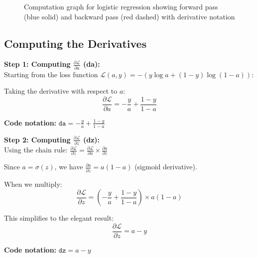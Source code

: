 \documentclass[11pt,a4paper]{article}
\theoremstyle{definition}
\theoremstyle{remark}
\begin{document}
\begin{figure}[H]
    \caption{Computation graph for logistic regression showing forward pass (blue solid) and backward pass (red dashed) with derivative notation}
    \label{fig:logistic_regression_graph}
\end{figure}

\clearpage
\subsection{Computing the Derivatives}

\begin{gradcomp}
\textbf{Step 1: Computing $\frac{\partial \mathcal{L}}{\partial a}$ (da):} \\
Starting from the loss function $\mathcal{L}(a, y) = -(y \log a + (1-y) \log(1-a))$:

Taking the derivative with respect to $a$:
\[
\frac{\partial \mathcal{L}}{\partial a} = -\frac{y}{a} + \frac{1-y}{1-a}
\]

\textbf{Code notation:} $\boxed{\texttt{da} = -\frac{y}{a} + \frac{1-y}{1-a}}$
\end{gradcomp}

\vspace{0.4cm}

\begin{gradcomp}
\textbf{Step 2: Computing $\frac{\partial \mathcal{L}}{\partial z}$ (dz):} \\
Using the chain rule: $\frac{\partial \mathcal{L}}{\partial z} = \frac{\partial \mathcal{L}}{\partial a} \times \frac{\partial a}{\partial z}$

Since $a = \sigma(z)$, we have $\frac{\partial a}{\partial z} = a(1-a)$ (sigmoid derivative).

When we multiply:
\[
\frac{\partial \mathcal{L}}{\partial z} = \left(-\frac{y}{a} + \frac{1-y}{1-a}\right) \times a(1-a)
\]

This simplifies to the elegant result:
\[
\boxed{\frac{\partial \mathcal{L}}{\partial z} = a - y}
\]

\textbf{Code notation:} $\boxed{\texttt{dz} = a - y}$
\end{gradcomp}
\end{document}
